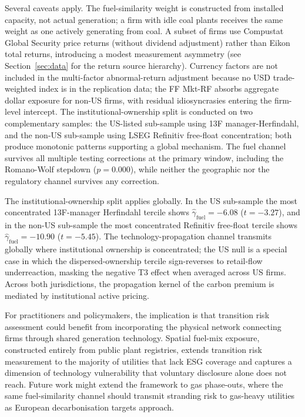 \documentclass[12pt,a4paper]{article}
\begin{document}
Several caveats apply. The fuel-similarity weight is constructed from installed capacity, not actual generation; a firm with idle coal plants receives the same weight as one actively generating from coal. A subset of firms use Compustat Global Security price returns (without dividend adjustment) rather than Eikon total returns, introducing a modest measurement asymmetry (see Section~\ref{sec:data} for the return source hierarchy). Currency factors are not included in the multi-factor abnormal-return adjustment because no USD trade-weighted index is in the replication data; the FF Mkt-RF absorbs aggregate dollar exposure for non-US firms, with residual idiosyncrasies entering the firm-level intercept. The institutional-ownership split is conducted on two complementary samples: the US-listed sub-sample using 13F manager-Herfindahl, and the non-US sub-sample using LSEG Refinitiv free-float concentration; both produce monotonic patterns supporting a global mechanism. The fuel channel survives all multiple testing corrections at the primary window, including the Romano-Wolf stepdown ($p = 0.000$), while neither the geographic nor the regulatory channel survives any correction.

The institutional-ownership split applies globally. In the US sub-sample the most concentrated 13F-manager Herfindahl tercile shows $\hat\gamma_{\text{fuel}} = -6.08$ ($t = -3.27$), and in the non-US sub-sample the most concentrated Refinitiv free-float tercile shows $\hat\gamma_{\text{fuel}} = -10.90$ ($t = -5.45$). The technology-propagation channel transmits globally where institutional ownership is concentrated; the US null is a special case in which the dispersed-ownership tercile sign-reverses to retail-flow underreaction, masking the negative T3 effect when averaged across US firms. Across both jurisdictions, the propagation kernel of the carbon premium is mediated by institutional active pricing.

For practitioners and policymakers, the implication is that transition risk assessment could benefit from incorporating the physical network connecting firms through shared generation technology. Spatial fuel-mix exposure, constructed entirely from public plant registries, extends transition risk measurement to the majority of utilities that lack ESG coverage and captures a dimension of technology vulnerability that voluntary disclosure alone does not reach. Future work might extend the framework to gas phase-outs, where the same fuel-similarity channel should transmit stranding risk to gas-heavy utilities as European decarbonisation targets approach.
\end{document}
